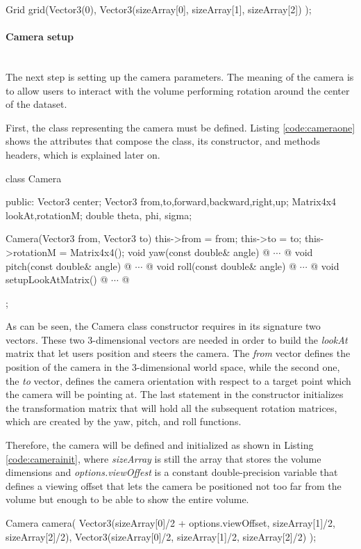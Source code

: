 \documentclass[12pt,a4paper]{extarticle}
\newcommand{\linespace}{\vspace{0pt}}
\newcommand{\myparagraph}[1]{\paragraph{#1}\mbox{}\\}
\begin{document}
\begin{cpp}[caption={Grid object initialization.},label=code:gridinit]
Grid grid(Vector3(0), 
	Vector3(sizeArray[0], sizeArray[1], sizeArray[2])
	);
\end{cpp}

\myparagraph{Camera setup} The next step is setting up the camera parameters. The meaning of the camera is to allow users to interact with the volume performing rotation around the center of the dataset.

First, the class representing the camera must be defined. Listing \ref{code:cameraone} shows the attributes that compose the class, its constructor, and methods headers, which is explained later on.

\begin{cpp}[caption={Camera class definition with },label=code:cameraone]
class Camera {
public:
	Vector3 center;
	Vector3 from,to,forward,backward,right,up;
	Matrix4x4 lookAt,rotationM;
	double theta, phi, sigma;

	Camera(Vector3 from, Vector3 to) {
		this->from = from;
		this->to = to;
		this->rotationM = Matrix4x4();
	}
	void yaw(const double& angle) {@ $\cdots$ @}
	void pitch(const double& angle) {@ $\cdots$ @}
	void roll(const double& angle) {@ $\cdots$ @}
	void setupLookAtMatrix() {@ $\cdots$ @}
};
\end{cpp}

As can be seen, the Camera class constructor requires in its signature two vectors. These two 3-dimensional vectors are needed in order to build the \textit{lookAt} matrix that let users position and steers the camera. The \textit{from} vector defines the position of the camera in the 3-dimensional world space, while the second one, the \textit{to} vector, defines the camera orientation with respect to a target point which the camera will be pointing at.
The last statement in the constructor initializes the transformation matrix that will hold all the subsequent rotation matrices, which are created by the yaw, pitch, and roll functions.
\linespace

Therefore, the camera will be defined and initialized as shown in Listing \ref{code:camerainit}, where \textit{sizeArray} is still the array that stores the volume dimensions and \textit{options.viewOffest} is a constant double-precision variable that defines a viewing offset that lets the camera be positioned not too far from the volume but enough to be able to show the entire volume.

\begin{cpp}[caption={Camera definition and initialization.},label=code:camerainit]
Camera camera(
	Vector3(sizeArray[0]/2 + options.viewOffset, 
		sizeArray[1]/2, sizeArray[2]/2), 
	Vector3(sizeArray[0]/2, sizeArray[1]/2, sizeArray[2]/2)
	);
\end{cpp} 
\end{document}
